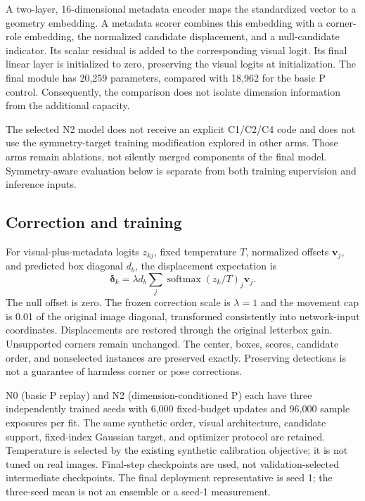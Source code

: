 \documentclass[journal]{IEEEtran}
\begin{document}
A two-layer, 16-dimensional metadata encoder maps the standardized vector to a geometry embedding. A metadata scorer combines this embedding with a corner-role embedding, the normalized candidate displacement, and a null-candidate indicator. Its scalar residual is added to the corresponding visual logit. Its final linear layer is initialized to zero, preserving the visual logits at initialization. The final module has 20,259 parameters, compared with 18,962 for the basic P control. Consequently, the comparison does not isolate dimension information from the additional capacity.

The selected N2 model does not receive an explicit C1/C2/C4 code and does not use the symmetry-target training modification explored in other arms. Those arms remain ablations, not silently merged components of the final model. Symmetry-aware evaluation below is separate from both training supervision and inference inputs.

\subsection{Correction and training}
For visual-plus-metadata logits $z_{kj}$, fixed temperature $T$, normalized offsets $\mathbf v_j$, and predicted box diagonal $d_b$, the displacement expectation is
\begin{equation}
\boldsymbol\delta_k=\lambda d_b\sum_j\operatorname{softmax}(z_k/T)_j\mathbf v_j.
\end{equation}
The null offset is zero. The frozen correction scale is $\lambda=1$ and the movement cap is 0.01 of the original image diagonal, transformed consistently into network-input coordinates. Displacements are restored through the original letterbox gain. Unsupported corners remain unchanged. The center, boxes, scores, candidate order, and nonselected instances are preserved exactly. Preserving detections is not a guarantee of harmless corner or pose corrections.

N0 (basic P replay) and N2 (dimension-conditioned P) each have three independently trained seeds with 6,000 fixed-budget updates and 96,000 sample exposures per fit. The same synthetic order, visual architecture, candidate support, fixed-index Gaussian target, and optimizer protocol are retained. Temperature is selected by the existing synthetic calibration objective; it is not tuned on real images. Final-step checkpoints are used, not validation-selected intermediate checkpoints. The final deployment representative is seed 1; the three-seed mean is not an ensemble or a seed-1 measurement.
\end{document}
